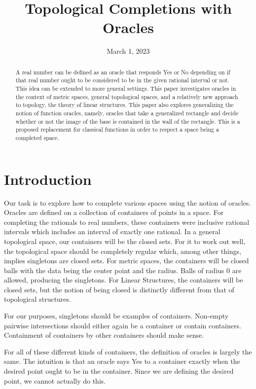\documentclass[12pt]{article}
\title{Topological Completions with Oracles}
\date{March 1, 2023}
\begin{document}
\maketitle
\begin{abstract}
A real number can be defined as an oracle that responds Yes or No depending on if that real number ought to be considered to be in the given rational interval or not. This idea can be extended to more general settings. This paper investigates oracles in the context of metric spaces, general topological spaces, and a relatively new approach to topology, the theory of linear structures. This paper also explores generalizing the notion of function oracles, namely, oracles that take a generalized rectangle and decide whether or not the image of the base is contained in the wall of the rectangle. This is a proposed replacement for classical functions in order to respect a space being a completed space. 
\end{abstract}

\section{Introduction}

Our task is to explore how to complete various spaces using the notion of oracles. Oracles are defined on a collection of containers of points in a space. For completing the rationals to real numbers, these containers were inclusive rational intervals which includes an interval of exactly one rational. In a general topological space, our containers will be the closed sets. For it to work out well, the topological space should be completely regular which, among other things, implies singletons are closed sets. For metric spaces, the containers will be closed balls with the data being the center point and the radius. Balls of radius 0 are allowed, producing the singletons. For Linear Structures, the containers will be closed sets, but the notion of being closed is distinctly different from that of topological structures. 

For our purposes, singletons should be examples of containers. Non-empty pairwise intersections should either again be a container or contain containers. Containment of containers by other containers should make sense. 

For all of these different kinds of containers, the definition of oracles is largely the same. The intuition is that an oracle says Yes to a container exactly when the desired point ought to be in the container. Since we are defining the desired point, we cannot actually do this. 
\end{document}
